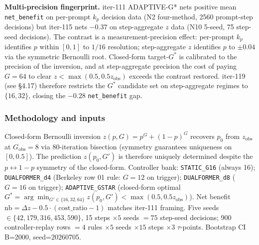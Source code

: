 \textbf{Multi-precision fingerprint.} iter-111 ADAPTIVE-G* nets positive
mean \texttt{net\_benefit} on per-prompt $k_p$ decision data (N2
four-method, 2560 prompt-step decisions) but iter-115 nets $-0.37$ on
step-aggregate $z$ data (N10 5-seed, 75 step-seed decisions). The
contrast is a measurement-precision effect: per-prompt $k_p$
identifies $p$ within $[0,1]$ to $1/16$ resolution; step-aggregate $z$
identifies $p$ to $\pm 0.04$ via the symmetric Bernoulli root.
Closed-form target-$G^*$ is calibrated to the precision of the
inversion, and at step-aggregate precision the cost of paying $G=64$
to clear $z<\max(0.5, 0.5z_{\mathrm{obs}})$ exceeds the contrast
restored. iter-119 (see §4.17) therefore restricts the
$G^*$ candidate set on step-aggregate regimes to $\{16, 32\}$,
closing the $-0.28$ \texttt{net\_benefit} gap.

\subsubsection*{Methodology and inputs}
Closed-form Bernoulli inversion $z(p,G)=p^G+(1-p)^G$ recovers
$p_0$ from $z_{\mathrm{obs}}$ at $G_{\mathrm{obs}}=8$ via 80-iteration
bisection (symmetry guarantees uniqueness on $[0,0.5]$). The
prediction $z(p_0, G')$ is therefore uniquely determined despite the
$p \leftrightarrow 1-p$ symmetry of the closed-form. Controller bank:
\texttt{STATIC\_G16} (always 16); \texttt{DUALFORMER\_d4}
(Berkeley row 01 rule: $G=12$ on trigger); \texttt{DUALFORMER\_d8}
($G=16$ on trigger); \texttt{ADAPTIVE\_GSTAR} (closed-form optimal
$G^*=\arg\min_{G'\in\{16,32,64\}}z(p_0,G')<\max(0.5,0.5z_{\mathrm{obs}})$).
Net benefit $\mathrm{nb}=\Delta z - 0.5\cdot(\mathrm{cost\_ratio}-1)$
matches iter-111 framing. Five seeds $\in\{42,179,316,453,590\}$, 15
steps $\times 5$ seeds $=75$ step-seed decisions; 900 controller-replay
rows $=4$ rules $\times 5$ seeds $\times 15$ steps $\times 3$
$\tau$-points. Bootstrap CI B=2000, seed=20260705.

